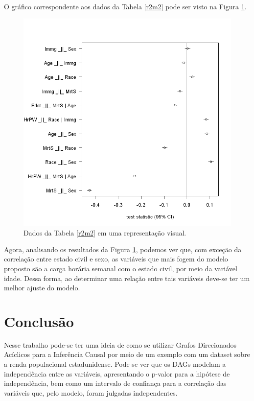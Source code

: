 \documentclass[11pt,letterpaper,twocolumn]{article}
\begin{document}
O gráfico correspondente aos dados da Tabela \ref{r2m2} pode ser visto na Figura \ref{r2m2f}.
\begin{figure}
    \centering
    \includegraphics[scale = 0.5]{A2/Imagens/r2m2.png}
    \caption{Dados da Tabela \ref{r2m2} em uma representação visual.}
    \label{r2m2f}
\end{figure}

Agora, analisando os resultados da Figura \ref{r2m2f}, podemos ver que, com exceção da correlação entre estado civil e sexo, as variáveis que mais fogem do modelo proposto são a carga horária semanal com o estado civil, por meio da variável idade. Dessa forma, ao determinar uma relação entre tais variáveis deve-se ter um melhor ajuste do modelo.

\section{Conclusão}
\justify

Nesse trabalho pode-se ter uma ideia de como se utilizar Grafos Direcionados Acíclicos para a Inferência Causal por meio de um exemplo com um dataset sobre a renda populacional estadunidense. Pode-se ver que os DAGs modelam a independência entre as variáveis, apresentando o p-valor para a hipótese de independência, bem como um intervalo de confiança para a correlação das variáveis que, pelo modelo, foram julgadas independentes.
\end{document}
